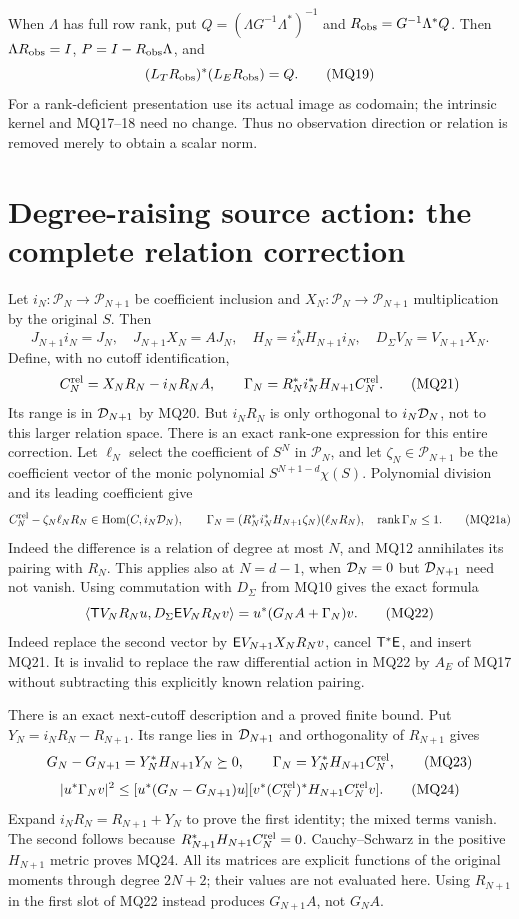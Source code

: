 \documentclass[11pt]{article}
\begin{document}
When $\Lambda$ has full row rank, put
$Q=(\Lambda G^{-1}\Lambda^*)^{-1}$ and
$R_{\rm obs}=G^{-1}\Lambda^*Q$. Then
$\Lambda R_{\rm obs}=I$, $P=I-R_{\rm obs}\Lambda$, and
\[
 (L_TR_{\rm obs})^*(L_ER_{\rm obs})=Q.                      \tag{MQ19}
\]
For a rank-deficient presentation use its actual image as codomain;
the intrinsic kernel and MQ17--18 need no change. Thus no observation
direction or relation is removed merely to obtain a scalar norm.

\section{Degree-raising source action: the complete relation correction}
Let $i_N:\mathcal P_N\to\mathcal P_{N+1}$ be coefficient inclusion
and $X_N:\mathcal P_N\to\mathcal P_{N+1}$ multiplication by the
original $S$. Then
\[
 J_{N+1}i_N=J_N,\quad J_{N+1}X_N=AJ_N,\quad
 H_N=i_N^*H_{N+1}i_N,\quad D_\Sigma V_N=V_{N+1}X_N.         \tag{MQ20}
\]
Define, with no cutoff identification,
\[
 C_N^{\rm rel}=X_NR_N-i_NR_NA,\qquad
 \Gamma_N=R_N^*i_N^*H_{N+1}C_N^{\rm rel}.                  \tag{MQ21}
\]
Its range is in $\mathcal D_{N+1}$ by MQ20. But $i_NR_N$ is only
orthogonal to $i_N\mathcal D_N$, not to this larger relation space.
There is an exact rank-one expression for this entire correction.
Let $\ell_N$ select the coefficient of $S^N$ in $\mathcal P_N$,
and let $\zeta_N\in\mathcal P_{N+1}$ be the coefficient vector
of the monic polynomial $S^{N+1-d}\chi(S)$. Polynomial division
and its leading coefficient give
\[
 C_N^{\rm rel}-\zeta_N\ell_NR_N\in
       \operatorname{Hom}(C,i_N\mathcal D_N),\qquad
 \Gamma_N=(R_N^*i_N^*H_{N+1}\zeta_N)(\ell_NR_N),\quad
 \operatorname{rank}\Gamma_N\le1.                          \tag{MQ21a}
\]
Indeed the difference is a relation of degree at most $N$, and
MQ12 annihilates its pairing with $R_N$. This applies also at
$N=d-1$, when $\mathcal D_N=0$ but $\mathcal D_{N+1}$ need not vanish.
Using commutation with $D_\Sigma$ from MQ10 gives the exact formula
\[
 \langle\mathsf T V_NR_Nu,D_\Sigma\mathsf E V_NR_Nv\rangle
       =u^*(G_NA+\Gamma_N)v.                               \tag{MQ22}
\]
Indeed replace the second vector by $\mathsf E V_{N+1}X_NR_Nv$,
cancel $\mathsf T^*\mathsf E$, and insert MQ21. It is invalid to replace
the raw differential action in MQ22 by $A_E$ of MQ17 without
subtracting this explicitly known relation pairing.

There is an exact next-cutoff description and a proved finite bound.
Put $Y_N=i_NR_N-R_{N+1}$. Its range lies in $\mathcal D_{N+1}$ and
orthogonality of $R_{N+1}$ gives
\[
 G_N-G_{N+1}=Y_N^*H_{N+1}Y_N\succeq0,\qquad
 \Gamma_N=Y_N^*H_{N+1}C_N^{\rm rel},                       \tag{MQ23}
\]
\[
 |u^*\Gamma_Nv|^2\le
   [u^*(G_N-G_{N+1})u]
   [v^*(C_N^{\rm rel})^*H_{N+1}C_N^{\rm rel}v].             \tag{MQ24}
\]
Expand $i_NR_N=R_{N+1}+Y_N$ to prove the first identity;
the mixed terms vanish. The second follows because
$R_{N+1}^*H_{N+1}C_N^{\rm rel}=0$. Cauchy--Schwarz in the
positive $H_{N+1}$ metric proves MQ24. All its matrices are
explicit functions of the original moments through degree $2N+2$;
their values are not evaluated here. Using $R_{N+1}$ in the first
slot of MQ22 instead produces $G_{N+1}A$, not $G_NA$.
\end{document}
